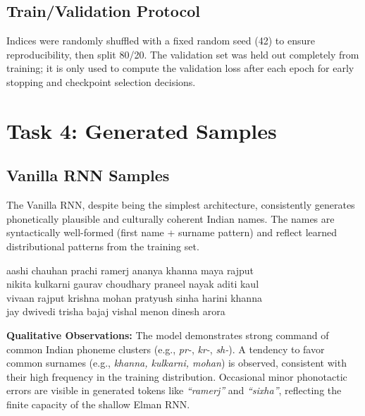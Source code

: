 \documentclass[11pt,a4paper]{article}
\begin{document}
\subsection{Train/Validation Protocol}
Indices were randomly shuffled with a fixed random seed (42) to ensure reproducibility, then split 80/20. The validation set was held out completely from training; it is only used to compute the validation loss after each epoch for early stopping and checkpoint selection decisions.

\clearpage
\section{Task 4: Generated Samples}

\subsection{Vanilla RNN Samples}
The Vanilla RNN, despite being the simplest architecture, consistently generates phonetically plausible and culturally coherent Indian names. The names are syntactically well-formed (first name + surname pattern) and reflect learned distributional patterns from the training set.

\begin{codeBox}[Selected Vanilla RNN Generated Names (Temperature = 0.8)]
aashi chauhan \quad prachi ramerj \quad ananya khanna \quad maya rajput \\
nikita kulkarni \quad gaurav choudhary \quad praneel nayak \quad aditi kaul \\
vivaan rajput \quad krishna mohan \quad pratyush sinha \quad harini khanna \\
jay dwivedi \quad trisha bajaj \quad vishal menon \quad dinesh arora
\end{codeBox}

\vspace{0.5em}

\textbf{Qualitative Observations:} The model demonstrates strong command of common Indian phoneme clusters (e.g., \textit{pr-}, \textit{kr-}, \textit{sh-}). A tendency to favor common surnames (e.g., \textit{khanna, kulkarni, mohan}) is observed, consistent with their high frequency in the training distribution. Occasional minor phonotactic errors are visible in generated tokens like \textit{``ramerj''} and \textit{``sixha''}, reflecting the finite capacity of the shallow Elman RNN.
\end{document}

